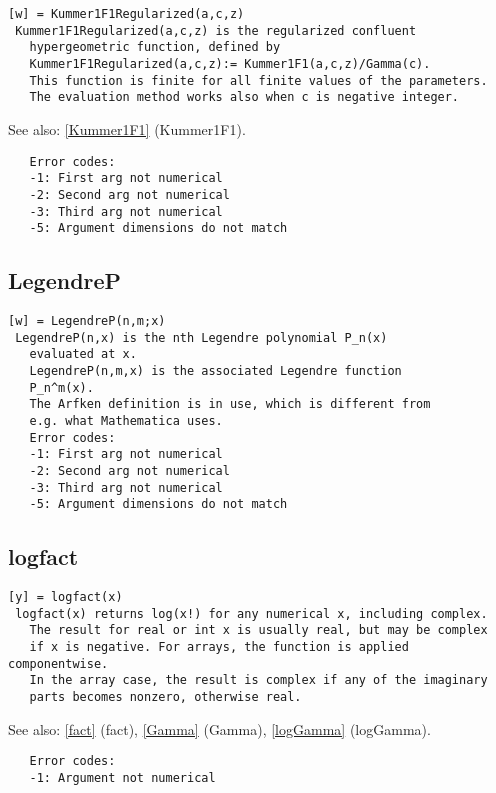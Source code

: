 \documentclass[a4paper]{article}
\begin{document}
\begin{tscreen}
\begin{verbatim}
[w] = Kummer1F1Regularized(a,c,z)
 Kummer1F1Regularized(a,c,z) is the regularized confluent
   hypergeometric function, defined by
   Kummer1F1Regularized(a,c,z):= Kummer1F1(a,c,z)/Gamma(c).
   This function is finite for all finite values of the parameters.
   The evaluation method works also when c is negative integer.
\end{verbatim}

See also: \ref{Kummer1F1} {(Kummer1F1)}.
\begin{verbatim}
   Error codes:
   -1: First arg not numerical
   -2: Second arg not numerical
   -3: Third arg not numerical
   -5: Argument dimensions do not match
\end{verbatim}
\end{tscreen}



\subsection{LegendreP\label{LegendreP}}

\begin{tscreen}
\begin{verbatim}
[w] = LegendreP(n,m;x)
 LegendreP(n,x) is the nth Legendre polynomial P_n(x)
   evaluated at x.
   LegendreP(n,m,x) is the associated Legendre function
   P_n^m(x).
   The Arfken definition is in use, which is different from
   e.g. what Mathematica uses.
   Error codes:
   -1: First arg not numerical
   -2: Second arg not numerical
   -3: Third arg not numerical
   -5: Argument dimensions do not match
\end{verbatim}
\end{tscreen}



\subsection{logfact\label{logfact}}

\begin{tscreen}
\begin{verbatim}
[y] = logfact(x)
 logfact(x) returns log(x!) for any numerical x, including complex.
   The result for real or int x is usually real, but may be complex
   if x is negative. For arrays, the function is applied componentwise.
   In the array case, the result is complex if any of the imaginary
   parts becomes nonzero, otherwise real.
\end{verbatim}

See also: \ref{fact} {(fact)}, \ref{Gamma} {(Gamma)}, \ref{logGamma} {(logGamma)}.
\begin{verbatim}
   Error codes:
   -1: Argument not numerical
 
\end{verbatim}
\end{tscreen}
\end{document}
